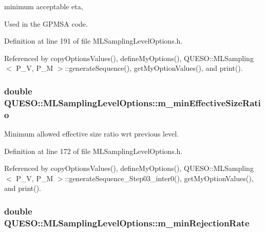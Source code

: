 minimum acceptable eta, 

Used in the G\-P\-M\-S\-A code. 

Definition at line 191 of file M\-L\-Sampling\-Level\-Options.\-h.



Referenced by copy\-Options\-Values(), define\-My\-Options(), Q\-U\-E\-S\-O\-::\-M\-L\-Sampling$<$ P\-\_\-\-V, P\-\_\-\-M $>$\-::generate\-Sequence(), get\-My\-Option\-Values(), and print().

\hypertarget{class_q_u_e_s_o_1_1_m_l_sampling_level_options_a58904c5920d9fa6673a8222529d5c143}{
\subsubsection[{m\-\_\-min\-Effective\-Size\-Ratio}]{\setlength{\rightskip}{0pt plus 5cm}double Q\-U\-E\-S\-O\-::\-M\-L\-Sampling\-Level\-Options\-::m\-\_\-min\-Effective\-Size\-Ratio}}\label{class_q_u_e_s_o_1_1_m_l_sampling_level_options_a58904c5920d9fa6673a8222529d5c143}


Minimum allowed effective size ratio wrt previous level. 



Definition at line 172 of file M\-L\-Sampling\-Level\-Options.\-h.



Referenced by copy\-Options\-Values(), define\-My\-Options(), Q\-U\-E\-S\-O\-::\-M\-L\-Sampling$<$ P\-\_\-\-V, P\-\_\-\-M $>$\-::generate\-Sequence\-\_\-\-Step03\-\_\-inter0(), get\-My\-Option\-Values(), and print().

\hypertarget{class_q_u_e_s_o_1_1_m_l_sampling_level_options_a6010e1a97f0712b376653819aa6cdbca}{
\subsubsection[{m\-\_\-min\-Rejection\-Rate}]{\setlength{\rightskip}{0pt plus 5cm}double Q\-U\-E\-S\-O\-::\-M\-L\-Sampling\-Level\-Options\-::m\-\_\-min\-Rejection\-Rate}}\label{class_q_u_e_s_o_1_1_m_l_sampling_level_options_a6010e1a97f0712b376653819aa6cdbca}


